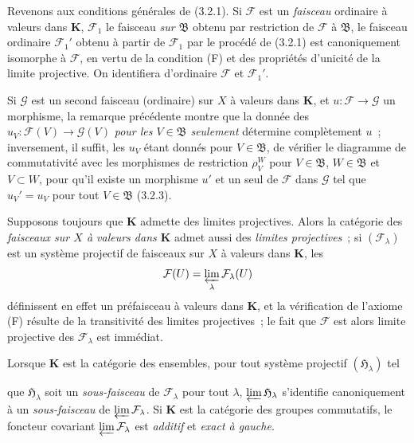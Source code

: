 \begin{env}[3.2.5]
\label{0.3.2.5-fr}
Revenons aux conditions générales de (3.2.1). Si $\mathcal{F}$ est un
\emph{faisceau} ordinaire à valeurs dans $\boldsymbol{K}$, $\mathcal{F}_1$ le
faisceau \emph{sur $\mathfrak{B}$} obtenu par restriction de $\mathcal{F}$ à
$\mathfrak{B}$, le faisceau ordinaire $\mathcal{F}_1'$ obtenu à partir de
$\mathcal{F}_1$ par le procédé de (3.2.1) est canoniquement isomorphe à
$\mathcal{F}$, en vertu de la condition (F) et des propriétés d'unicité de la
limite projective. On identifiera d'ordinaire $\mathcal{F}$ et
$\mathcal{F}_1'$.

Si $\mathcal{G}$ est un second faisceau (ordinaire) sur $X$ à valeurs dans
$\boldsymbol{K}$, et $u:\mathcal{F}\to\mathcal{G}$ un morphisme, la remarque
précédente montre que la donnée des
$u_V:\mathcal{F}(V)\to\mathcal{G}(V)$ \emph{pour les $V\in\mathfrak{B}$
seulement} détermine complètement $u$~; inversement, il suffit, les $u_V$
étant donnés pour $V\in\mathfrak{B}$, de vérifier le diagramme de commutativité
avec les morphismes de restriction $\rho_V^W$ pour $V\in\mathfrak{B}$,
$W\in\mathfrak{B}$ et $V\subset W$, pour qu'il existe un morphisme $u'$ et un
seul de $\mathcal{F}$ dans $\mathcal{G}$ tel que $u_V'=u_V$ pour tout
$V\in\mathfrak{B}$ (3.2.3).
\end{env}

\begin{env}[3.2.6]
\label{0.3.2.6-fr}
Supposons toujours que $\boldsymbol{K}$ admette des limites projectives. Alors la
catégorie des \emph{faisceaux sur $X$ à valeurs dans $\boldsymbol{K}$} admet aussi
des \emph{limites projectives}~; si $(\mathcal{F}_\lambda)$ est un système
projectif de faisceaux sur $X$ à valeurs dans $\boldsymbol{K}$, les
\[
  \mathcal{F}(U)=\varprojlim_\lambda\mathcal{F}_\lambda(U)
\]
définissent en effet un préfaisceau à valeurs dans $\boldsymbol{K}$, et la
vérification de l'axiome (F) résulte de la transitivité des limites
projectives~; le fait que $\mathcal{F}$ est alors limite projective des
$\mathcal{F}_\lambda$ est immédiat.

Lorsque $\boldsymbol{K}$ est la catégorie des ensembles, pour tout système
projectif $(\mathfrak{H}_\lambda)$ tel


que $\mathfrak{H}_\lambda$ soit un \emph{sous-faisceau} de
$\mathcal{F}_\lambda$ pour tout $\lambda$,
$\varprojlim\mathfrak{H}_\lambda$ s'identifie canoniquement à un
\emph{sous-faisceau} de $\varprojlim\mathcal{F}_\lambda$. Si
$\boldsymbol{K}$ est la catégorie des groupes commutatifs, le foncteur covariant
$\varprojlim\mathcal{F}_\lambda$ est \emph{additif} et \emph{exact à gauche}.
\end{env}

